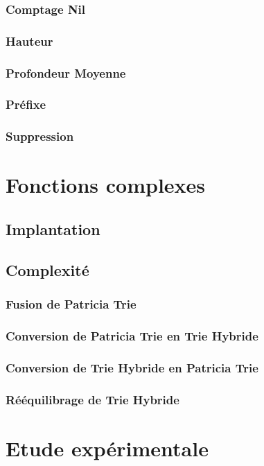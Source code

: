 \documentclass[a4paper,12pt]{report}
\begin{document}
\subsection{Comptage Nil}
\subsection{Hauteur}
\subsection{Profondeur Moyenne}
\subsection{Préfixe}
\subsection{Suppression}
\chapter{Fonctions complexes}
\section{Implantation}
\section{Complexité}
\subsection{Fusion de Patricia Trie}
\subsection{Conversion de Patricia Trie en Trie Hybride}
\subsection{Conversion de Trie Hybride en Patricia Trie}
\subsection{Rééquilibrage de Trie Hybride}
\chapter{Etude expérimentale}
\end{document}
